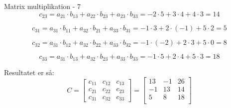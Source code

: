 \documentclass{article}
\begin{document}
\begin{exercise}{Matrix multiplikation - 7}
	\hint
	\[
		c_{23} = a_{21} \cdot b_{13} + a_{22} \cdot b_{23} + a_{23} \cdot b_{33} = -2 \cdot 5 + 3 \cdot 4 + 4 \cdot 3 = 14
	\]
	
	\hint
	\[
		c_{31} = a_{31} \cdot b_{11} + a_{32} \cdot b_{21} + a_{33} \cdot b_{31} = -1 \cdot 3 + 2 \cdot (-1) + 5 \cdot 2 = 5
	\]	
	
	\hint
	\[
		c_{32} = a_{31} \cdot b_{12} + a_{32} \cdot b_{22} + a_{33} \cdot b_{32} = -1 \cdot (-2) + 2 \cdot 3 + 5 \cdot 0 = 8
	\]
	
	\hint
	\[
		c_{33} = a_{31} \cdot b_{13} + a_{32} \cdot b_{23} + a_{33} \cdot b_{33} = -1 \cdot 5 + 2 \cdot 4 + 5 \cdot 3= 18
	\]	
	
	
	
	\hint
	Resultatet er så:
	\[
	C = \left[\begin{array}{rrr}
	c_{11} & c_{12} & c_{13} \\
	c_{21} & c_{22} & c_{23} \\
	c_{31} & c_{32} & c_{33}
	\end{array} \right] = 
	\left[\begin{array}{rrr}
	13 & -1 & 26 \\
	-1 & 13 & 14 \\
	5 & 8 & 18 \\
	\end{array} \right]
	\]
	
	
\end{exercise}

\newpage
\end{document}
